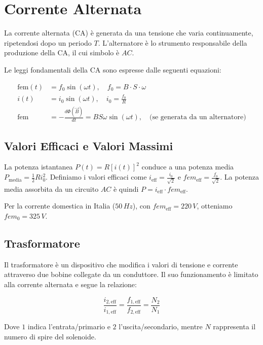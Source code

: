 
\section{Corrente Alternata}

La corrente alternata (CA) è generata da una tensione che varia continuamente, ripetendosi dopo un periodo $T$.
L'alternatore è lo strumento responsabile della produzione della CA, il cui simbolo è $AC$.

Le leggi fondamentali della CA sono espresse dalle seguenti equazioni:

\begin{align*}
    \text{fem}(t) & = f_0 \sin(\omega t), \quad f_0 = B \cdot S \cdot \omega                                               \\
    i(t)          & = i_0 \sin(\omega t), \quad i_0 = \frac{f_0}{R}                                                        \\
    \text{fem}    & = - \frac{d \Phi(\vec{B})}{d t} = BS\omega\sin(\omega t), \quad \text{(se generata da un alternatore)}
\end{align*}

\subsection{Valori Efficaci e Valori Massimi}

La potenza istantanea $P(t) = R[i(t)]^2$ conduce a una potenza media $P_{\text{media}} = \frac{1}{2} R i_0^2$.
Definiamo i valori efficaci come $i_{\text{eff}} = \frac{i_0}{\sqrt{2}}$ e $fem_{\text{eff}} = \frac{f_0}{\sqrt{2}}$.
La potenza media assorbita da un circuito $AC$ è quindi $P = i_{\text{eff}} \cdot fem_{\text{eff}}$.

Per la corrente domestica in Italia ($50\,Hz$), con $fem_{\text{eff}} = 220\,V$, otteniamo $fem_0 = 325\,V$.

\subsection{Trasformatore}

Il trasformatore è un dispositivo che modifica i valori di tensione e corrente attraverso due bobine collegate da un conduttore.
Il suo funzionamento è limitato alla corrente alternata e segue la relazione:

\begin{equation*}
    \frac{i_{2,\text{eff}}}{i_{1,\text{eff}}} = \frac{f_{1,\text{eff}}}{f_{2,\text{eff}}} = \frac{N_2}{N_1}
\end{equation*}

Dove $1$ indica l'entrata/primario e $2$ l'uscita/secondario, mentre $N$ rappresenta il numero di spire del solenoide.

